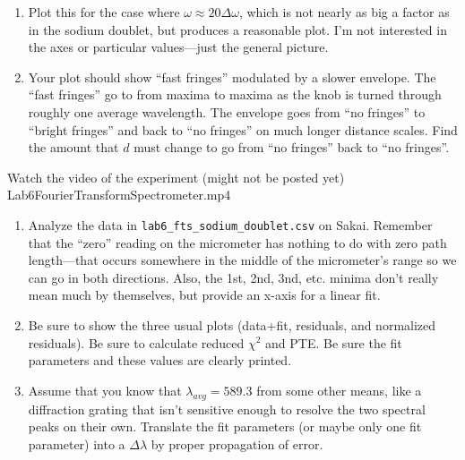 \documentclass[11pt]{hmcpset}
\begin{document}
\begin{problem}
\begin{enumerate}
	\item Plot this for the case where $\omega \approx 20 \Delta \omega$, which is not nearly as big a factor as in the sodium doublet, but produces a reasonable plot. I'm not interested in the axes or particular values---just the general picture.
	\item Your plot should show ``fast fringes'' modulated by a slower envelope. The ``fast fringes'' go to from maxima to maxima as the knob is turned through roughly one average wavelength. The envelope goes from ``no fringes'' to ``bright fringes'' and back to ``no fringes'' on much longer distance scales. Find the amount that $d$ must change to go from ``no fringes'' back to ``no fringes''.
	\end{enumerate}
\end{problem}

\begin{solution}
	\vfill
\end{solution}
\pagebreak


\begin{problem}
	Watch the video of the experiment (might not be posted yet) Lab6FourierTransformSpectrometer.mp4  \\
	\begin{enumerate}
			\item Analyze the data in \texttt{lab6\_fts\_sodium\_doublet.csv} on Sakai. Remember that the ``zero'' reading on the micrometer has nothing to do with zero path length---that occurs somewhere in the middle of the micrometer's range so we can go in both directions. Also, the 1st, 2nd, 3nd, etc. minima don't really mean much by themselves, but provide an x-axis for a linear fit.
			\item Be sure to show the three usual plots (data+fit, residuals, and normalized residuals). Be sure to calculate reduced $\chi^2$ and PTE. Be sure the fit parameters and these values are clearly printed.
			\item Assume that you know that $\lambda_{avg}=589.3$ from some other means, like a diffraction grating that isn't sensitive enough to resolve the two spectral peaks on their own. Translate the fit parameters (or maybe only one fit parameter) into a $\Delta \lambda$ by proper propagation of error.
    \end{enumerate}
\end{problem}

\begin{solution}
\vfill
\end{solution}
\pagebreak
\end{document}
